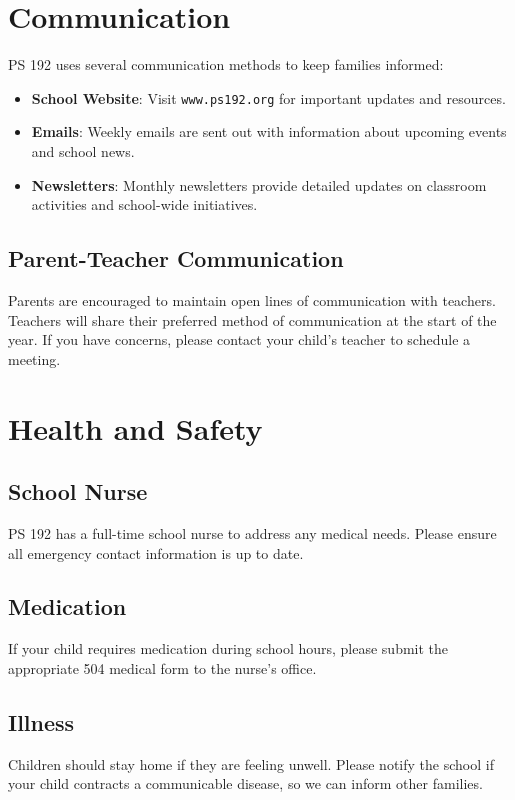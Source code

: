 \documentclass[11pt]{article}
\begin{document}
\section{Communication}
\label{sec:orgb3d7d11}
PS 192 uses several communication methods to keep families informed:
\begin{itemize}
\item \textbf{\textbf{School Website}}: Visit \texttt{www.ps192.org} for important updates and resources.
\item \textbf{\textbf{Emails}}: Weekly emails are sent out with information about upcoming events and school news.
\item \textbf{\textbf{Newsletters}}: Monthly newsletters provide detailed updates on classroom activities and school-wide initiatives.
\end{itemize}

\subsection{Parent-Teacher Communication}
\label{sec:orgab249d5}
Parents are encouraged to maintain open lines of communication with teachers. Teachers will share their preferred method of communication at the start of the year. If you have concerns, please contact your child’s teacher to schedule a meeting.

\section{Health and Safety}
\label{sec:org1d14a15}
\subsection{School Nurse}
\label{sec:org86ab375}
PS 192 has a full-time school nurse to address any medical needs. Please ensure all emergency contact information is up to date.

\subsection{Medication}
\label{sec:orgbe6f854}
If your child requires medication during school hours, please submit the appropriate 504 medical form to the nurse’s office.

\subsection{Illness}
\label{sec:org8c030a3}
Children should stay home if they are feeling unwell. Please notify the school if your child contracts a communicable disease, so we can inform other families.
\end{document}
